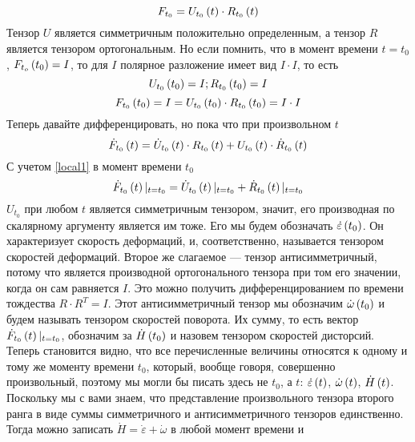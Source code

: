 \documentclass[a4papper, 14pt]{book}
\renewcommand{\epsilon}{\ensuremath{\varepsilon}}
\newcommand{\lf}{\ensuremath \left(}
\newcommand{\ri}{\ensuremath \right)}
\theoremstyle{plain} %
\theoremstyle{definition} %
\theoremstyle{remark} %
\begin{document}
	\begin{equation}
	F_{t_0} = U_{t_0}\lf t \ri\cdot R_{t_0}\lf t \ri
	\end{equation}
	Тензор $U$ является симметричным положительно определенным, а тензор $R$ является тензором ортогональным. Но если помнить, что в момент времени $t = t_0$,  $F_{t_o} \lf t_0 \ri = I$, то для $I$ полярное разложение имеет вид $I \cdot I$, то есть 
	\begin{equation}\label{local1}
	U_{t_0}\lf t_0 \ri = I ; R_{t_0}\lf t_0 \ri = I
	\end{equation}
	\begin{equation}
	F_{t_0}\lf t_0 \ri = I =U_{t_0}\lf t_0 \ri\cdot R_{t_0}\lf t_0 \ri =I\cdot I
	\end{equation}
	Теперь давайте дифференцировать, но пока что при произвольном $t$
	\begin{equation}
	\dot{F}_{t_0}\lf t \ri = \dot{U}_{t_0}\lf t \ri\cdot R_{t_0}\lf t \ri + U_{t_0}\lf t \ri\cdot \dot{R}_{t_0}\lf t \ri 
	\end{equation}
	С учетом \eqref{local1} в момент времени $t_0$
	\begin{equation}
	\dot{F}_{t_0}\lf t \ri\vert_{t = t_0} = \dot{U}_{t_0}\lf t \ri\vert_{t = t_0} + \dot{R}_{t_0}\lf t \ri\vert_{t = t_0}     
	\end{equation}
	$U_{t_0}$ при любом $t$ является симметричным тензором, значит, его производная по скалярному аргументу является им тоже. Его мы будем обозначать $\dot{\epsilon}\lf t_0 \ri $. Он характеризует скорость деформаций, и, соответственно, называется тензором скоростей деформаций. Второе же слагаемое --- тензор антисимметричный, потому что является производной ортогонального тензора при том его значении, когда он сам равняется $I$. Это можно получить дифференцированием по времени тождества $R \cdot R^{T} = I$. Этот антисимметричный тензор мы обозначим $\dot{\omega}\lf t_0 \ri$ и будем называть тензором скоростей поворота. Их сумму, то есть вектор $\dot{F}_{t_0}\lf t \ri\vert_{t = t_0}$, обозначим за $\dot{H}\lf t_0 \ri$ и назовем тензором скоростей дисторсий. Теперь становится видно, что все перечисленные величины относятся к одному и тому же моменту времени $t_0$, который, вообще говоря, совершенно произвольный, поэтому мы могли бы писать здесь не $t_0$, а $t$: $\dot{\epsilon}\lf t \ri $, $\dot{\omega}\lf t \ri$, $\dot{H}\lf t \ri$. \\
	Поскольку мы с вами знаем, что представление произвольного тензора второго ранга в виде суммы симметричного и антисимметричного тензоров единственно. Тогда можно записать $\dot{H} = \dot{\epsilon}+\dot{\omega}$ в любой момент времени и
\end{document}
